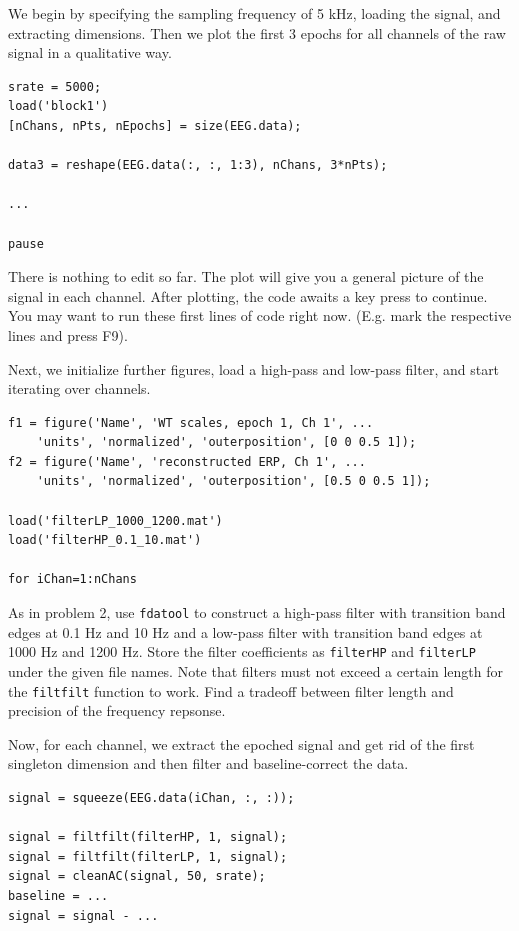 \documentclass[10pt,a4paper,notitlepage]{report}
\begin{document}
We begin by specifying the sampling frequency of 5 kHz, loading the signal, and extracting dimensions. Then we plot the first 3 epochs for all channels of the raw signal in a qualitative way.

\begin{verbatim}
srate = 5000;
load('block1')
[nChans, nPts, nEpochs] = size(EEG.data);

data3 = reshape(EEG.data(:, :, 1:3), nChans, 3*nPts);

...

pause
\end{verbatim}

There is nothing to edit so far. The plot will give you a general picture of the signal in each channel. After plotting, the code awaits a key press to continue. You may want to run these first lines of code right now. (E.g. mark the respective lines and press F9).

Next, we initialize further figures, load a high-pass and low-pass filter, and start iterating over channels.

\begin{verbatim}
f1 = figure('Name', 'WT scales, epoch 1, Ch 1', ...
    'units', 'normalized', 'outerposition', [0 0 0.5 1]);
f2 = figure('Name', 'reconstructed ERP, Ch 1', ...
    'units', 'normalized', 'outerposition', [0.5 0 0.5 1]);

load('filterLP_1000_1200.mat')
load('filterHP_0.1_10.mat')

for iChan=1:nChans
\end{verbatim}

As in problem 2, use \texttt{fdatool} to construct a high-pass filter with transition band edges at 0.1 Hz and 10 Hz and a low-pass filter with transition band edges at 1000 Hz and 1200 Hz. Store the filter coefficients as \texttt{filterHP} and \texttt{filterLP} under the given file names. Note that filters must not exceed a certain length for the \texttt{filtfilt} function to work. Find a tradeoff between filter length and precision of the frequency repsonse.

Now, for each channel, we extract the epoched signal and get rid of the first singleton dimension and then filter and baseline-correct the data.

\begin{verbatim}
signal = squeeze(EEG.data(iChan, :, :));

signal = filtfilt(filterHP, 1, signal);
signal = filtfilt(filterLP, 1, signal);
signal = cleanAC(signal, 50, srate);
baseline = ...
signal = signal - ...
\end{verbatim}
\end{document}
